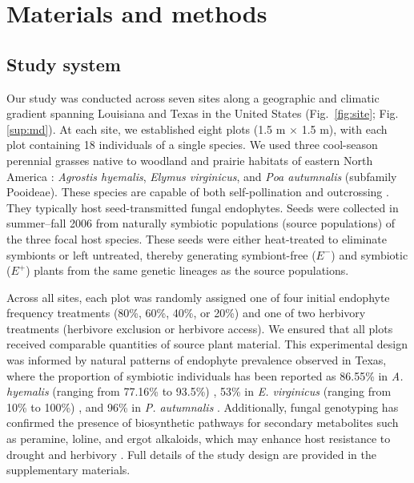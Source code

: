\documentclass[12pt]{article}\usepackage[]{graphicx}\usepackage[dvipsnames]{xcolor}
\begin{document}
\section*{Materials and methods}
\subsection*{Study system}
Our study was conducted across seven sites along a geographic and climatic gradient spanning Louisiana and Texas in the United States (Fig.~\ref{fig:site}; Fig.\ref{sup:md}).  
At each site, we established eight plots (1.5 m $\times$ 1.5 m), with each plot containing 18 individuals of a single species. We used three cool-season perennial grasses native to woodland and prairie habitats of eastern North America \citep{shaw2011guide}: \emph{Agrostis hyemalis}, \emph{Elymus virginicus}, and \emph{Poa autumnalis} (subfamily Pooideae).  
These species are capable of both self-pollination and outcrossing \citep{church1958artificial}.  
They typically host seed-transmitted fungal endophytes.
Seeds were collected in summer–fall 2006 from naturally symbiotic populations (source populations) of the three focal host species. These seeds were either heat-treated to eliminate symbionts or left untreated, thereby generating symbiont-free ($E^-$) and symbiotic ($E^+$) plants from the same genetic lineages as the source populations.

Across all sites, each plot was randomly assigned one of four initial endophyte frequency treatments (80\%, 60\%, 40\%, or 20\%) and one of two herbivory treatments (herbivore exclusion or herbivore access).  
We ensured that all plots received comparable quantities of source plant material.
This experimental design was informed by natural patterns of endophyte prevalence observed in Texas, where the proportion of symbiotic individuals has been reported as 86.55\% in \emph{A. hyemalis} (ranging from 77.16\% to 93.5\%) \citep{donald2021context}, 53\% in \emph{E. virginicus} (ranging from 10\% to 100\%) \citep{sneck2017variation}, and 96\% in \emph{P. autumnalis} \citep{rudgers2009fungus}.  
Additionally, fungal genotyping has confirmed the presence of biosynthetic pathways for secondary metabolites such as peramine, loline, and ergot alkaloids, which may enhance host resistance to drought and herbivory \citep{beaudry1951seed}.
Full details of the study design are provided in the supplementary materials.
\end{document}
